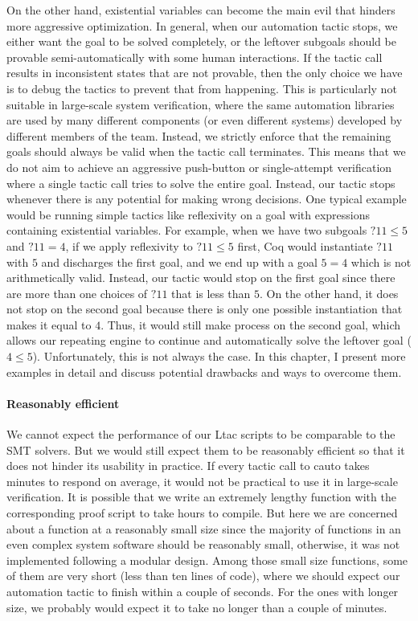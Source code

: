 On the other hand, existential variables can become the main evil that hinders
more aggressive optimization. In general, when our automation tactic stops,
we either want the goal to be solved completely, or the leftover subgoals
should be provable semi-automatically with some human interactions.
If the tactic call results in inconsistent states that are not provable,
then the only choice we have is to debug the tactics to prevent that from
happening. This is particularly not suitable in large-scale system verification,
where the same automation libraries are used by many different components
(or even different systems) developed by different members of the team.
Instead, we strictly enforce that the remaining goals should always be valid
when the tactic call terminates. This means that we do not aim to achieve
an aggressive push-button or single-attempt verification where a single tactic
call tries to solve the entire goal. Instead, our tactic stops whenever
there is any potential for making wrong decisions. One typical example would
be running simple tactics like \textsf{reflexivity} on a goal with expressions
containing existential variables. For example, when we have two subgoals
$?11\le5$ and $?11=4$, if we apply \textsf{reflexivity} to $?11\le5$ first,
Coq would instantiate $?11$ with $5$ and discharges the first goal, and
we end up with a goal $5=4$ which is not arithmetically valid. Instead,
our tactic would stop on the first goal since there are more than one choices
of $?11$ that is less than $5$. On the other hand, it does not stop on the second
goal because there is only one possible instantiation that makes it equal to $4$.
Thus, it would still make process on the second goal, which allows our repeating
engine to continue and automatically solve the leftover goal ($4\le5$).
Unfortunately, this is not always the case. In this chapter, I present
more examples in detail and discuss potential drawbacks and ways to overcome
them.


\paragraph{Reasonably efficient}

We cannot expect the performance of our Ltac scripts to be comparable
to the SMT solvers. But we would still expect them to be
reasonably efficient so that it does not hinder its usability in practice.
If every tactic call to \textsf{cauto} takes minutes to respond on average,
it would not be practical to use it in large-scale verification.
It is possible that we write an extremely lengthy function with the
corresponding proof script to take hours to compile. But here we are
concerned about a function at a reasonably small size since the majority
of functions in an even complex system software should be reasonably small,
otherwise, it was not implemented following a modular design.
Among those small size functions, some of them are very short (less than
ten lines of code), where we should expect our automation tactic to
finish within a couple of seconds. For the ones with longer size,
we probably would expect it to take no longer than a couple of minutes.

